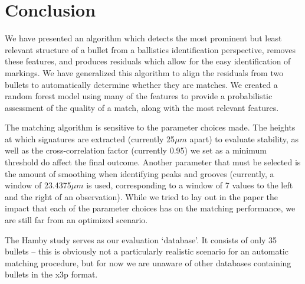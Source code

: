 \documentclass[aoas, preprint]{imsart}\usepackage[]{graphicx}\usepackage[]{color}
\begin{document}
\section{Conclusion}

We have presented an algorithm which detects the most prominent but least relevant structure of a bullet from a ballistics identification perspective, removes these features, and produces residuals which allow for the easy identification of markings. We have generalized this algorithm to align the residuals from two bullets to automatically determine whether they are matches. We created a random forest model using many of the features to provide a probabilistic assessment of the quality of a match, along with the most relevant features. %

The matching algorithm is sensitive to the parameter choices made. The heights at which signatures are extracted (currently 25$\mu m$ apart) to evaluate stability, as well as the cross-correlation factor (currently 0.95) we set as a minimum threshold do affect the final outcome. Another parameter that must be selected is the amount of smoothing when identifying peaks and grooves (currently, a window of 23.4375$\mu m$ is used, corresponding to a window of 7 values to the left and the right of an observation). While we tried to lay out in the paper the impact that each of the parameter choices has on the matching performance, we are still far from an optimized scenario. 

The Hamby study serves as our evaluation `database'. It consists of only  35 bullets -- this is obviously not a particularly realistic scenario for an automatic matching procedure, but for now we are unaware of other databases containing bullets in the x3p format.
 
\end{document}
